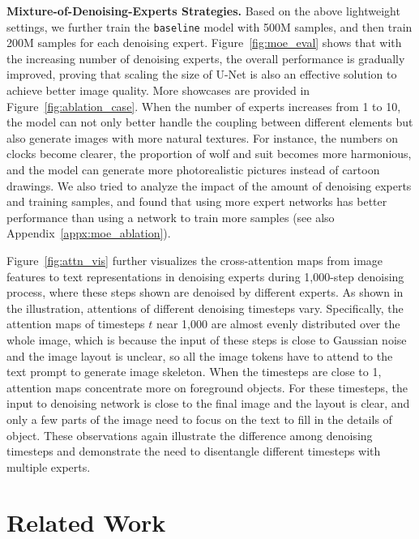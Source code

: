 \documentclass[10pt,twocolumn,letterpaper]{article}
\begin{document}
\noindent\textbf{Mixture-of-Denoising-Experts Strategies.}
Based on the above lightweight settings, we further train the \verb|baseline| model with 500M samples, and then train 200M samples for each denoising expert.
Figure~\ref{fig:moe_eval} shows that with the increasing number of denoising experts, the overall performance is gradually improved, proving that scaling the size of U-Net is also an effective solution to achieve better image quality.
More showcases are provided in Figure~\ref{fig:ablation_case}. 
When the number of experts increases from 1 to 10, the model can not only better handle the coupling between different elements but also generate images with more natural textures. For instance, the numbers on clocks become clearer, the proportion of wolf and suit becomes more harmonious, and the model can generate more photorealistic pictures instead of cartoon drawings.
We also tried to analyze the impact of the amount of denoising experts and training samples, and found that using more expert networks has better performance than using a network to train more samples (see also Appendix~\ref{appx:moe_ablation}).

Figure~\ref{fig:attn_vis} further visualizes the cross-attention maps from image features to text representations in denoising experts during 1,000-step denoising process, where these steps shown are denoised by different experts.
As shown in the illustration, attentions of different denoising timesteps vary. 
Specifically, the attention maps of timesteps $t$ near 1,000 are almost evenly distributed over the whole image, which is because the input of these steps is close to Gaussian noise and the image layout is unclear, so all the image tokens have to attend to the text prompt to generate image skeleton.
When the timesteps are close to 1, attention maps concentrate more on foreground objects. For these timesteps, the input to denoising network is close to the final image and the layout is clear, and only a few parts of the image need to focus on the text to fill in the details of object.
These observations again illustrate the difference among denoising timesteps and demonstrate the need to disentangle different timesteps with multiple experts.

\section{Related Work}
\end{document}
